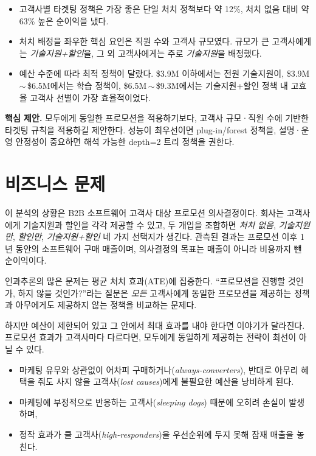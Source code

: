 \documentclass[11pt]{article}
\begin{document}
\begin{itemize}[leftmargin=1.4em, itemsep=2pt]
  \item 고객사별 타겟팅 정책은 가장 좋은 단일 처치 정책보다 약 12\%, 처치 없음 대비 약 63\% 높은 순이익을 냈다.
  \item 처치 배정을 좌우한 핵심 요인은 직원 수와 고객사 규모였다. 규모가 큰 고객사에게는 \emph{기술지원+할인}을, 그 외 고객사에게는 주로 \emph{기술지원}을 배정했다.
  \item 예산 수준에 따라 최적 정책이 달랐다. \$3.9M 이하에서는 전원 기술지원이, \$3.9M\,$\sim$\,\$6.5M에서는 학습 정책이, \$6.5M\,$\sim$\,\$9.3M에서는 기술지원+할인 정책 내 고효율 고객사 선별이 가장 효율적이었다.
\end{itemize}

\textbf{핵심 제안.} 모두에게 동일한 프로모션을 적용하기보다, 고객사 규모·직원 수에 기반한 타겟팅 규칙을 적용하길 제안한다. 성능이 최우선이면 plug-in/forest 정책을, 설명·운영 안정성이 중요하면 해석 가능한 depth=2 트리 정책을 권한다.

\newpage

\section{비즈니스 문제}

이 분석의 상황은 B2B 소프트웨어 고객사 대상 프로모션 의사결정이다. 회사는 고객사에게 기술지원과 할인을 각각 제공할 수 있고, 두 개입을 조합하면 \emph{처치 없음}, \emph{기술지원만}, \emph{할인만}, \emph{기술지원+할인} 네 가지 선택지가 생긴다. 관측된 결과는 프로모션 이후 1년 동안의 소프트웨어 구매 매출이며, 의사결정의 목표는 매출이 아니라 비용까지 뺀 순이익이다.

인과추론의 많은 문제는 평균 처치 효과(ATE)에 집중한다. ``프로모션을 진행할 것인가, 하지 않을 것인가?''라는 질문은 \emph{모든} 고객사에게 동일한 프로모션을 제공하는 정책과 아무에게도 제공하지 않는 정책을 비교하는 문제다.

하지만 예산이 제한되어 있고 그 안에서 최대 효과를 내야 한다면 이야기가 달라진다. 프로모션 효과가 고객사마다 다르다면, 모두에게 동일하게 제공하는 전략이 최선이 아닐 수 있다.

\begin{itemize}[leftmargin=1.4em, itemsep=2pt]
  \item 마케팅 유무와 상관없이 어차피 구매하거나(\emph{always-converters}), 반대로 아무리 혜택을 줘도 사지 않을 고객사(\emph{lost causes})에게 불필요한 예산을 낭비하게 된다.
  \item 마케팅에 부정적으로 반응하는 고객사(\emph{sleeping dogs}) 때문에 오히려 손실이 발생하며,
  \item 정작 효과가 클 고객사(\emph{high-responders})을 우선순위에 두지 못해 잠재 매출을 놓친다.
\end{itemize}
\end{document}
